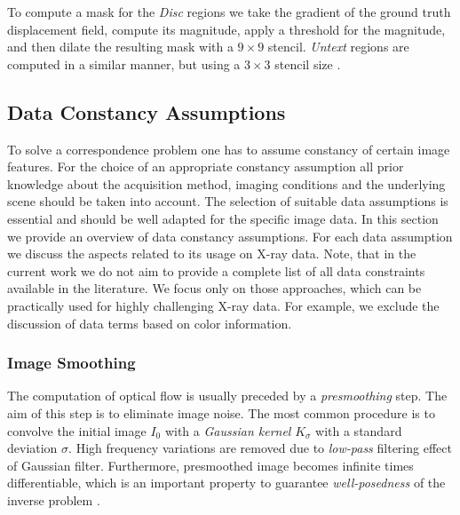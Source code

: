 To compute a mask for the \textit{Disc} regions we take the gradient of
the ground truth displacement field, compute its magnitude, apply a threshold for the magnitude, and then dilate the resulting mask with a $9 \times 9$ stencil. \textit{Untext} regions are computed in a similar manner, but using a $3 \times 3$ stencil size \cite{Middl}. 





\subsection{Data Constancy Assumptions}
\label{data_constancy_assumptions}


To solve a correspondence problem one has to assume constancy of certain image features. For the choice of an appropriate constancy assumption all prior knowledge about the acquisition method, imaging conditions and the underlying scene should be taken into account. The selection of suitable data  assumptions is essential and should be well adapted for the specific image data. In this section we provide an overview of data constancy assumptions. For each data assumption we discuss the aspects related to its usage on X-ray data.  Note, that in the current work we do not aim to provide a complete list of all data constraints available in the literature. We focus only on those approaches, which can be practically used for highly challenging  X-ray data. For example, we exclude the discussion of data terms based on color information.

\subsubsection{Image Smoothing}
\label{image_smoothing}

The computation of optical flow is usually preceded by a \textit{presmoothing} step. The aim of this step is to eliminate image noise. The most common procedure is to convolve the initial image $I_0$ with a \textit{Gaussian kernel} $K_{\sigma}$ with a standard deviation $\sigma$. High frequency variations are removed due to \textit{low-pass} filtering effect of Gaussian filter.
Furthermore, presmoothed image becomes infinite times differentiable, which is an important property to guarantee \textit{well-posedness} of the inverse problem \cite{HSSW01}. 

